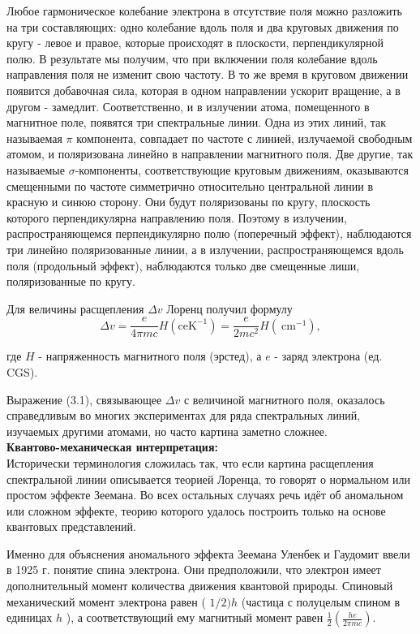 \documentclass[a4paper, 12pt]{article}%
\begin{document}
	Любое гармоническое колебание электрона в отсутствие поля можно разложить на три составляющих: одно колебание вдоль поля и два круговых движения по кругу - левое и правое, которые происходят в плоскости, перпендикулярной полю. В результате мы получим, что при включении поля колебание вдоль направления поля не изменит свою частоту. В то же время в круговом движении появится добавочная сила, которая в одном направлении ускорит вращение, а в другом - замедлит. Соответственно, и в излучении атома, помещенного в магнитное поле, появятся три спектральные линии. Одна из этих линий, так называемая $\pi$ компонента, совпадает по частоте с линией, излучаемой свободным атомом, и поляризована линейно в направлении магнитного поля. Две другие, так называемые $\sigma$-компоненты, соответствующие круговым движениям, оказываются смещенными по частоте симметрично относительно центральной линии в красную и синюю сторону. Они будут поляризованы по кругу, плоскость которого перпендикулярна направлению поля. Поэтому в излучении, распространяющемся перпендикулярно полю (поперечный эффект), наблюдаются три линейно поляризованные линии, а в излучении, распространяющемся вдоль поля (продольный эффект), наблюдаются только две смещенные лиши, поляризованные по кругу.
	
	Для величины расщепления $\Delta v$ Лоренц получил формулу
	$$
	\Delta v=\frac{e}{4 \pi m c} H\left(\mathrm{ceK}^{-1}\right)=\frac{e}{2 m c^2} H\left(\mathrm{~cm}^{-1}\right),
	$$
	
	где $H$ - напряженность магнитного поля (эрстед), а $e$ - заряд электрона (ед. CGS).
	
	Выражение (3.1), связывающее $\Delta v$ с величиной магнитного поля, оказалось справедливым во многих экспериментах для ряда спектральных линий, изучаемых другими атомами, но часто картина заметно сложнее.\\
	
	\textbf{Квантово-механическая интерпретация: } \\
	
	Исторически терминология сложилась так, что если картина расщепления спектральной линии описывается теорией Лоренца, то говорят о нормальном или простом эффекте Зеемана. Во всех остальных случаях речь идёт об аномальном или сложном эффекте, теорию которого удалось построить только на основе квантовых представлений.
	
	Именно для объяснения аномального эффекта Зеемана Уленбек и Гаудомит ввели в 1925 г. понятие спина электрона. Они предположили, что электрон имеет дополнительный момент количества движения квантовой природы. Спиновый механический момент электрона равен ( $1 / 2) h$ (частица с полуцелым спином в единицах $h$ ), а соответствующий ему магнитный момент равен $\frac{1}{2}\left(\frac{h e}{2 \pi m c}\right)$.
	
\end{document}
